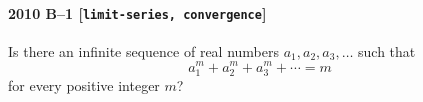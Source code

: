 \paragraph{2010 B--1 \textnormal{[\texttt{limit-series, convergence}]}}
Is there an infinite sequence of real numbers $a_1, a_2, a_3, \dots$ such that
\[
a_1^m + a_2^m + a_3^m + \cdots = m
\]
for every positive integer $m$?
